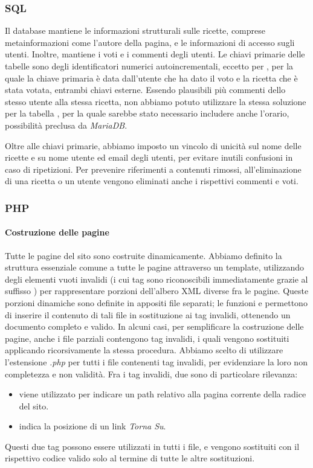 \subsubsection{SQL}
Il database mantiene le informazioni strutturali sulle ricette, comprese metainformazioni come l'autore della pagina, e le informazioni di accesso sugli utenti.
Inoltre, mantiene i voti e i commenti degli utenti.
Le chiavi primarie delle tabelle sono degli identificatori numerici autoincrementali, eccetto per , per la quale la chiave primaria è data dall'utente che ha dato il voto e la ricetta che è stata votata, entrambi chiavi esterne.
Essendo plausibili più commenti dello stesso utente alla stessa ricetta, non abbiamo potuto utilizzare la stessa soluzione per la tabella , per la quale sarebbe stato necessario includere anche l'orario, possibilità preclusa da \textit{MariaDB}.

Oltre alle chiavi primarie, abbiamo imposto un vincolo di unicità sul nome delle ricette e su nome utente ed email degli utenti, per evitare inutili confusioni in caso di ripetizioni.
Per prevenire riferimenti a contenuti rimossi, all'eliminazione di una ricetta o un utente vengono eliminati anche i rispettivi commenti e voti.

\subsubsection{PHP}\label{subs:php}
\paragraph{Costruzione delle pagine}
Tutte le pagine del sito sono costruite dinamicamente.
Abbiamo definito la struttura essenziale comune a tutte le pagine attraverso un template, utilizzando degli elementi vuoti invalidi (i cui tag sono riconoscibili immediatamente grazie al suffisso ) per rappresentare porzioni dell'albero XML diverse fra le pagine.
Queste porzioni dinamiche sono definite in appositi file separati; le funzioni  e  permettono di inserire il contenuto di tali file in sostituzione ai tag invalidi, ottenendo un documento completo e valido.
In alcuni casi, per semplificare la costruzione delle pagine, anche i file parziali contengono tag invalidi, i quali vengono sostituiti applicando ricorsivamente la stessa procedura.
Abbiamo scelto di utilizzare l'estensione \textit{.php} per tutti i file contenenti tag invalidi, per evidenziare la loro non completezza e non validità.
Fra i tag invalidi, due sono di particolare rilevanza:
\begin{itemize}
	\item {} viene utilizzato per indicare un path relativo alla pagina corrente della radice del sito.
	\item {} indica la posizione di un link \textit{Torna Su}.
\end{itemize}
Questi due tag possono essere utilizzati in tutti i file, e vengono sostituiti con il rispettivo codice valido solo al termine di tutte le altre sostituzioni.

